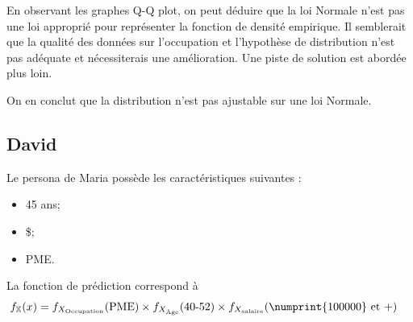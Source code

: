 \documentclass[11pt,french]{report}\usepackage[]{graphicx}\usepackage[]{color}
\begin{document}
En observant les graphes Q-Q plot, on peut déduire que la loi Normale n'est pas une loi approprié pour représenter la fonction de densité empirique. Il semblerait que la qualité des données sur l'occupation et l'hypothèse de distribution n'est pas adéquate et nécessiterais une amélioration. Une piste de solution est abordée plus loin.

On en conclut que la distribution n'est pas ajustable sur une loi Normale.

\subsection*{David}
Le persona de Maria possède les caractéristiques suivantes : 
\begin{itemize}
\item 45 ans;
\item{} \$;
\item PME.
\end{itemize}
La fonction de prédiction correspond à
\begin{align*}
f_{\mathbb{X}}(x) &= f_{X_{\text{Occupation}}}(\text{PME}) \times f_{X_{\text{Âge}}}(\text{40-52}) \times f_{X_{\text{salaire}}}(\text{\numprint{100000} et +})
\end{align*}
\end{document}
